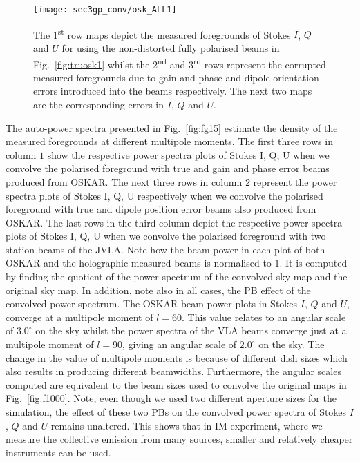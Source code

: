 \begin{figure}
\begin{minipage}[H]{\linewidth}
      \centering
      \texttt{[image: sec3gp\_conv/osk\_ALL1]}
    \end{minipage}
     \caption{The 1\textsuperscript{st} row maps depict the measured foregrounds of Stokes $I$, $Q$ and $U$ for using the non-distorted fully polarised beams in 
     Fig.~\ref{fig:truosk1} whilst the 2\textsuperscript{nd} and 3\textsuperscript{rd} rows represent the corrupted measured foregrounds due to gain and phase and dipole 
     orientation errors introduced into the beams respectively. The next two maps are the corresponding errors in $I$, $Q$ and $U$.}\label{fig:fgGP}
    \end{figure}
    \FloatBarrier
The auto-power spectra presented in Fig.~\ref{fig:fg15} estimate the density of the measured foregrounds at different multipole moments. The first three rows in column $1$ show the respective power spectra plots of Stokes I, Q, U when we convolve the polarised foreground with true and gain and phase error beams produced from OSKAR. The next three rows in column $2$ represent the power spectra plots of Stokes I, Q, U respectively when we convolve the polarised foreground with true and dipole position error beams also produced from OSKAR. The last rows in the third column depict the respective power spectra plots of Stokes I, Q, U when we convolve the polarised foreground with two station beams of the JVLA. Note how the beam power in each plot of both OSKAR and the holographic measured beams is normalised to $1$. It is computed by finding the quotient of the power spectrum of the convolved sky map and the original sky map. In addition, note also in all cases, the PB effect of the convolved power spectrum.
The OSKAR beam power plots in Stokes $I$, $Q$ and $U$, converge at a multipole moment of $l=60$.
This value relates to an angular scale of $3.0^\circ$ on the sky whilst the power spectra of the VLA beams converge just at a multipole moment of $l=90$, giving an
angular scale of $2.0^\circ$ on the sky. The change in the value of multipole moments is because of different dish sizes which also results in producing different beamwidths. 
Furthermore, the angular scales computed are equivalent to the beam sizes used to convolve the original maps in Fig.~\ref{fig:f1000}. 
Note, even though we used two different aperture sizes for the simulation, the effect of these two PBs on the convolved power spectra of Stokes $I$, $Q$ and $U$ 
remains unaltered. This shows that in IM experiment, where we  measure the collective emission from many sources, smaller and relatively cheaper instruments can be used.
